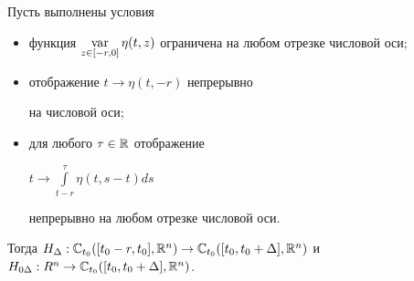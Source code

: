\begin{lems}


Пусть выполнены условия


\begin{itemize}


\item[1)] функция $\Var\limits_{z\in [-r,0] }


\eta (t,z) $ ограничена на любом отрезке числовой оси$;$


\item[2)] отображение $t \to \eta (t,-r) $ непрерывно 


на числовой оси$;$


\item[3)] для любого $\tau\in\Bbb{R}$ отображение 


$t \to \int\limits_{t-r}^{\tau}\eta (t,s-t) ds$


непрерывно на любом отрезке числовой оси.


\end{itemize}


Тогда $H_{\Delta}:\Bbb C_{t_{0}} ([t_{0}-r,t_{0}]


,\Bbb{R}^{n}) \to  \Bbb C_{t_{0}} ([t_{0}


,t_{0}+\Delta],\Bbb{R}^{n})$ и  $H_{0\Delta}


:R^{n} \to  \Bbb C_{t_{0}} ([t_{0},t_{0}+\Delta]


,\Bbb{R}^{n})$.


\end{lems}





